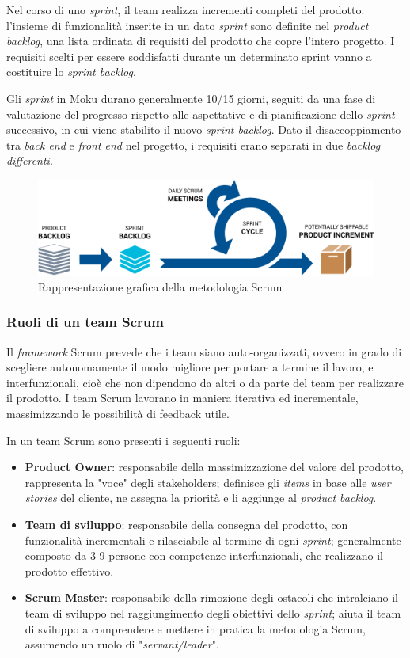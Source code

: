 Nel corso di uno \textit{sprint}, il team realizza incrementi completi del prodotto: l'insieme di funzionalità inserite in un dato \textit{sprint} sono definite nel \textit{product backlog}, una lista ordinata di requisiti del prodotto che copre l'intero progetto. I requisiti scelti per essere soddisfatti durante un determinato sprint vanno a costituire lo \textit{sprint backlog}.

Gli \textit{sprint} in Moku durano generalmente 10/15 giorni, seguiti da una fase di valutazione del progresso rispetto alle aspettative e di pianificazione dello \textit{sprint} successivo, in cui viene stabilito il nuovo \textit{sprint backlog}. Dato il disaccoppiamento tra \textit{back end} e \textit{front end} nel progetto, i requisiti erano separati in due \textit{backlog differenti}.

\begin{figure}[h!]
    \includegraphics[width=\textwidth]{figures/agile-development-process.png}
    \caption[Scrum]{Rappresentazione grafica della metodologia Scrum
    \label{fig:scrum}}
\end{figure}    

\subsubsection{Ruoli di un team Scrum}
Il \textit{framework} Scrum prevede che i team siano auto-organizzati, ovvero in grado di scegliere autonomamente il modo migliore per portare a termine il lavoro, e interfunzionali, cioè che non dipendono da altri o da parte del team per realizzare il prodotto. I team Scrum lavorano in maniera iterativa ed incrementale, massimizzando le possibilità di feedback utile. 

In un team Scrum sono presenti i seguenti ruoli:
\begin{itemize}
    \item \textbf{Product Owner}: responsabile della massimizzazione del valore del prodotto, rappresenta la "voce" degli stakeholders; definisce gli \textit{items} in base alle \textit{user stories} del cliente, ne assegna la priorità e li aggiunge al \textit{product backlog}.
    \item \textbf{Team di sviluppo}: responsabile della consegna del prodotto, con funzionalità incrementali e rilasciabile al termine di ogni \textit{sprint}; generalmente composto da 3-9 persone con competenze interfunzionali, che realizzano il prodotto effettivo.
    \item \textbf{Scrum Master}: responsabile della rimozione degli ostacoli che intralciano il team di sviluppo nel raggiungimento degli obiettivi dello \textit{sprint}; aiuta il team di sviluppo a comprendere e mettere in pratica la metodologia Scrum, assumendo un ruolo di "\textit{servant/leader}".
\end{itemize}


